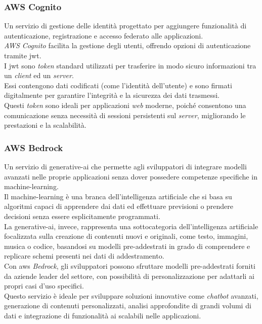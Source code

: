 \subsubsection{AWS Cognito}

Un servizio di gestione delle identità progettato per aggiungere funzionalità di autenticazione, registrazione e accesso federato alle applicazioni.\\
\textit{AWS Cognito} facilita la gestione degli utenti, offrendo opzioni di autenticazione tramite \gls{jwt}.\\

\noindent I \gls{jwt} sono \textit{token} standard utilizzati per trasferire in modo sicuro informazioni tra un \textit{client} ed un \textit{server}.\\
Essi contengono dati codificati (come l'identità dell'utente) e sono firmati digitalmente per garantire l'integrità e la sicurezza dei dati trasmessi.\\
\pagebreak
Questi \textit{token} sono ideali per applicazioni \textit{web} moderne, poiché consentono una comunicazione senza necessità di sessioni persistenti sul \textit{server}, migliorando le prestazioni e la scalabilità.

\subsubsection{AWS Bedrock}

Un servizio di \gls{generative-ai} che permette agli sviluppatori di integrare modelli avanzati nelle proprie applicazioni senza dover possedere competenze specifiche in \gls{machine-learning}.\\

\noindent Il \gls{machine-learning} è una branca dell’intelligenza artificiale che si basa su algoritmi capaci di apprendere dai dati ed effettuare previsioni o prendere decisioni senza essere esplicitamente programmati.\\ 
La \gls{generative-ai}, invece, rappresenta una sottocategoria dell’intelligenza artificiale focalizzata sulla creazione di contenuti nuovi e originali, come testo, immagini, musica o codice,
basandosi su modelli pre-addestrati in grado di comprendere e replicare schemi presenti nei dati di addestramento.\\

\noindent Con \gls{aws} \textit{Bedrock}, gli sviluppatori possono sfruttare modelli pre-addestrati forniti da aziende leader del settore, con possibilità di personalizzazione per adattarli ai propri casi d’uso specifici.\\
Questo servizio è ideale per sviluppare soluzioni innovative come \textit{chatbot} avanzati, generazione di contenuti personalizzati, analisi approfondite di grandi volumi di dati e integrazione di funzionalità \gls{ai} scalabili nelle applicazioni.\\ 

